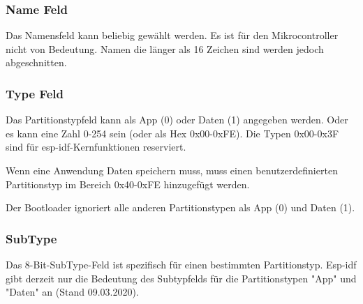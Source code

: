 
\subsubsection{Name Feld}
Das Namensfeld kann beliebig gewählt werden. Es ist für den Mikrocontroller nicht von Bedeutung. Namen die länger als 16 Zeichen sind werden jedoch abgeschnitten.

\subsubsection{Type Feld}
Das Partitionstypfeld kann als App (0) oder Daten (1) angegeben werden. Oder es kann eine Zahl 0-254 sein (oder als Hex 0x00-0xFE). Die Typen 0x00-0x3F sind für esp-idf-Kernfunktionen reserviert.

Wenn eine Anwendung Daten speichern muss, muss einen benutzerdefinierten Partitionstyp im Bereich 0x40-0xFE hinzugefügt werden.

Der Bootloader ignoriert alle anderen Partitionstypen als App (0) und Daten (1).

\subsubsection{SubType}
Das 8-Bit-SubType-Feld ist spezifisch für einen bestimmten Partitionstyp. Esp-idf gibt derzeit nur die Bedeutung des Subtypfelds für die Partitionstypen "App" und "Daten" an (Stand 09.03.2020).


